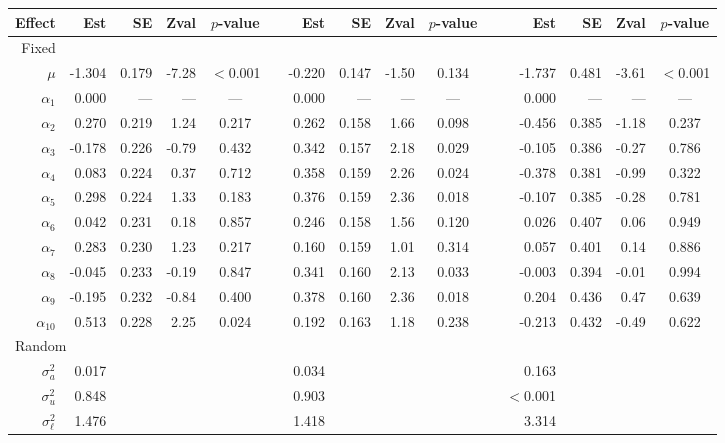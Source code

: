 \documentclass[10pt]{article}\usepackage[]{graphicx}\usepackage[]{color}
\begin{document}
\begin{table}[htbp]
{\begin{tabular}{rrrrccrrrccrrrc}
\cline{2-5} \cline{7-10} \cline{12-15} 
 Effect& Est & SE & Zval & $p$-value && Est & SE & Zval & $p$-value && Est & SE & Zval & $p$-value \\ 
  \hline
Fixed &  &  &  & && &  & & & & & &  & \\ 
$\mu$ & -1.304 & 0.179 & -7.28 & $<$0.001 &   & -0.220 & 0.147 & -1.50 & 0.134 &   & -1.737 & 0.481 & -3.61 & $<$0.001 \\ 
  $\alpha_1$ & 0.000 & --- & --- & --- &   & 0.000 & --- & --- & --- &  & 0.000 & --- & --- & ---  \\ 
  $\alpha_2$ & 0.270 & 0.219 & 1.24 & 0.217 &   & 0.262 & 0.158 & 1.66 & 0.098 &   & -0.456 & 0.385 & -1.18 & 0.237 \\ 
  $\alpha_3$ & -0.178 & 0.226 & -0.79 & 0.432 &   & 0.342 & 0.157 & 2.18 & 0.029 &   & -0.105 & 0.386 & -0.27 & 0.786 \\ 
  $\alpha_4$ & 0.083 & 0.224 & 0.37 & 0.712 &   & 0.358 & 0.159 & 2.26 & 0.024 &   & -0.378 & 0.381 & -0.99 & 0.322 \\ 
  $\alpha_5$ & 0.298 & 0.224 & 1.33 & 0.183 &   & 0.376 & 0.159 & 2.36 & 0.018 &   & -0.107 & 0.385 & -0.28 & 0.781 \\ 
  $\alpha_6$ & 0.042 & 0.231 & 0.18 & 0.857 &   & 0.246 & 0.158 & 1.56 & 0.120 &   & 0.026 & 0.407 & 0.06 & 0.949 \\ 
  $\alpha_7$ & 0.283 & 0.230 & 1.23 & 0.217 &   & 0.160 & 0.159 & 1.01 & 0.314 &   & 0.057 & 0.401 & 0.14 & 0.886 \\ 
  $\alpha_8$ & -0.045 & 0.233 & -0.19 & 0.847 &   & 0.341 & 0.160 & 2.13 & 0.033 &   & -0.003 & 0.394 & -0.01 & 0.994 \\ 
  $\alpha_9$ & -0.195 & 0.232 & -0.84 & 0.400 &   & 0.378 & 0.160 & 2.36 & 0.018 &   & 0.204 & 0.436 & 0.47 & 0.639 \\ 
  $\alpha_{10}$ & 0.513 & 0.228 & 2.25 & 0.024 &   & 0.192 & 0.163 & 1.18 & 0.238 &   & -0.213 & 0.432 & -0.49 & 0.622 \\ 
\multicolumn{2}{l}{Random}   &  &  &  &  & & &&& & & &  & \\ 
  $\sigma^2_a$ &  0.017 &&  &  &   &  0.034 &&  &  &   &  0.163 &&  &  \\ 
  $\sigma^2_u$  & 0.848 &&  &  &    & 0.903 &&  &  &   &  $<$0.001 &&  &  \\ 
  $\sigma^2_{\ell}$  & 1.476 &&  &  &    & 1.418 &&  &  &   &  3.314 &&  &  \\ 
   \hline
\end{tabular}
}
\label{tbl:model_result_response}
\end{table}
\end{document}
